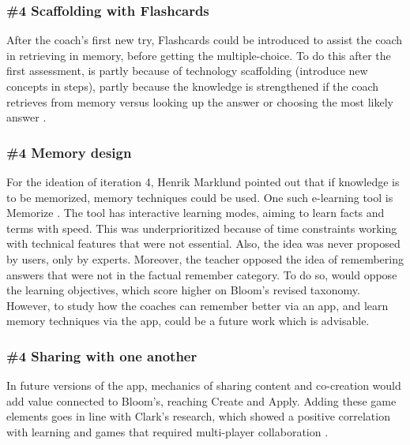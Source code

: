 \subsubsection{\#4 Scaffolding with Flashcards}
After the coach's first new try, Flashcards could be introduced to assist the coach in retrieving in memory, before getting the multiple-choice. To do this after the first assessment, is partly because of technology scaffolding (introduce new concepts in steps), partly because the knowledge is strengthened if the coach retrieves from memory versus looking up the answer or choosing the most likely answer \cite{bjork}.

\subsubsection{\#4 Memory design}
For the ideation of iteration 4, Henrik Marklund pointed out that if knowledge is to be memorized, memory techniques could be used. One such e-learning tool is Memorize \cite{Memorize}. The tool has interactive learning modes, aiming to learn facts and terms with speed. This was underprioritized because of time constraints working with technical features that were not essential. Also, the idea was never proposed by users, only by experts. Moreover, the teacher opposed the idea of remembering answers that were not in the factual remember category. To do so, would oppose the learning objectives, which score higher on Bloom's revised taxonomy. However, to study how the coaches can remember better via an app, and learn memory techniques via the app, could be a future work which is advisable.


\subsubsection{\#4 Sharing with one another}

In future versions of the app, mechanics of sharing content and co-creation would add value connected to Bloom's, reaching Create and Apply. Adding these game elements goes in line with Clark's research, which showed a positive correlation with learning and games that required multi-player collaboration \citep{gates}.
